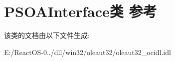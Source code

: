 \hypertarget{class_p_s_o_a_interface}{}\section{P\+S\+O\+A\+Interface类 参考}
\label{class_p_s_o_a_interface}


该类的文档由以下文件生成\+:\begin{DoxyCompactItemize}
\item 
E\+:/\+React\+O\+S-\/0../dll/win32/oleaut32/oleaut32\+\_\+ocidl.\+idl\end{DoxyCompactItemize}
